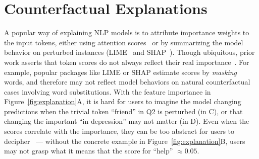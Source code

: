 
\newcommand{\fwone}[1]{\colbox{cfwone}{#1}\xspace}
\newcommand{\fwtwo}[1]{\colbox{cfwtwo}{#1}\xspace}
\newcommand{\fwthree}[1]{\colbox{cfwthree}{#1}\xspace}
\newcommand{\fwfour}[1]{\colbox{cfwfour}{#1}\xspace}

\newcommand{\fexp}[2]{\texttt{[{\color{darkgray}{#1:#2}}]}\xspace}
\newcommand{\fexptag}[1]{\fexp{TAG}{#1}}
\newcommand{\fexpfrom}[1]{\fexp{FROM}{#1}}
\newcommand{\fexpto}[1]{\fexp{TO}{#1}}
\newcommand{\fexptemp}[1]{\fexp{TEMP}{#1}}


\section{Counterfactual Explanations}
\label{sec:app_explain}





A popular way of explaining NLP models is to attribute importance weights to the input tokens, either using attention scores~\cite{wiegreffe2019attention} or by summarizing the model behavior on perturbed instances (\eg LIME~\cite{Ribeiro2016WhySI} and SHAP~\cite{NIPS2017_7062}).
Though ubiquitous, prior work asserts that token scores do not always reflect their real importance~\cite{pruthi2020learning}.
For example, popular packages like LIME or SHAP estimate scores by \emph{masking} words, and therefore may not reflect model behaviors on natural counterfactual cases involving \eg word substitutions.
With the feature importance in Figure~\ref{fig:explanation}A, it is hard for users to imagine the model changing predictions when the trivial token ``friend'' in Q2 is perturbed (in C), or that changing the important ``in depression'' may not matter (in D).
Even when the scores correlate with the importance, they can be too abstract for users to decipher~\cite{miller} --- without the concrete example in Figure~\ref{fig:explanation}B, users may not grasp what it means that the score for ``help'' ${\approx}0.05$. 

